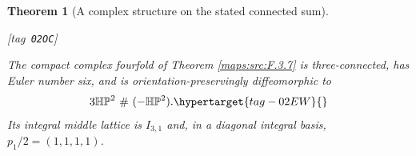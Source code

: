 \documentclass[11pt,a4paper]{article}
\numberwithin{equation}{section}
\newtheorem{theorem}{Theorem}[section]
\theoremstyle{definition}
\newcommand{\StatementRecord}[4]{{\upshape\footnotesize[tag~\texttt{#3}]}\enspace\ignorespaces}
\begin{document}
\begin{theorem}[A complex structure on the stated connected sum]\hypertarget{tag-02OC}{}\label{maps:src:F.4.1}
\StatementRecord{maps:src:F.4.1}{proved}{02OC}{\cref{maps:src:F.3.7}, \cref{maps:src:F.2.6}, \cref{sec:V-known-inputs}, \cref{night:P1.13}; \cite[Corollary 1.4, p.~4]{ffMandal}; \cite[Definition 3.6 and Theorem 3.7(1), pp.~12--14]{IVVWallForm}; \cite[Theorem~A, p.~178]{IVVKramerStolz}}


The compact complex fourfold of Theorem \ref{maps:src:F.3.7} is three-connected,
has Euler number six, and is orientation-preservingly diffeomorphic to
\begin{equation}
 3\mathbb H\mathbb P^2\ \#\ (-\mathbb H\mathbb P^2).
 \hypertarget{tag-02EW}{}\label{maps:eq:F.25}
\end{equation}
Its integral middle lattice is $I_{3,1}$ and, in a diagonal integral
basis, $p_1/2=(1,1,1,1)$.  

\end{theorem}
\end{document}
